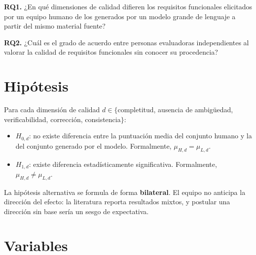 \documentclass[11pt,a4paper]{article}
\begin{document}
\noindent
\textbf{RQ1.} ¿En qué dimensiones de calidad difieren los requisitos funcionales elicitados por un
equipo humano de los generados por un modelo grande de lenguaje a partir del mismo material fuente?

\noindent
\textbf{RQ2.} ¿Cuál es el grado de acuerdo entre personas evaluadoras independientes al valorar la
calidad de requisitos funcionales sin conocer su procedencia?

\section{Hipótesis}

Para cada dimensión de calidad $d \in \{$completitud, ausencia de ambigüedad, verificabilidad,
corrección, consistencia$\}$:

\begin{itemize}[nosep,leftmargin=1.6em]
  \item $H_{0,d}$: no existe diferencia entre la puntuación media del conjunto humano y la del
        conjunto generado por el modelo. Formalmente, $\mu_{H,d} = \mu_{L,d}$.
  \item $H_{1,d}$: existe diferencia estadísticamente significativa. Formalmente,
        $\mu_{H,d} \neq \mu_{L,d}$.
\end{itemize}

\noindent
La hipótesis alternativa se formula de forma \textbf{bilateral}. El equipo no anticipa la dirección
del efecto: la literatura reporta resultados mixtos, y postular una dirección sin base sería un
sesgo de expectativa.

\section{Variables}
\end{document}
